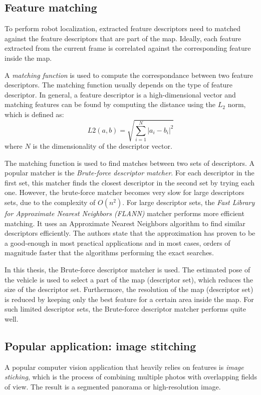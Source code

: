 \subsection{Feature matching}
\label{sec:theory_feature_matching}
To perform robot localization, extracted feature descriptors need to matched against the feature descriptors that are part of the map.
Ideally, each feature extracted from the current frame is correlated against the corresponding feature inside the map.

A \textit{matching function} is used to compute the correspondance between two feature descriptors.
The matching function usually depends on the type of feature descriptor.
In general, a feature descriptor is a high-dimensional vector and matching features can be found by computing the distance using the $L_2$ norm, which is defined as:
\begin{equation}
L2(a,b) =\sqrt { \sum_{i=1}^{N} \left| a_i - b_i \right| ^2 }
\end{equation}
where $N$ is the dimensionality of the descriptor vector.

The matching function is used to find matches between two sets of descriptors.
A popular matcher is the \textit{Brute-force descriptor matcher}. For each descriptor in the first set, this matcher finds the closest descriptor in the second set by trying each one.
However, the brute-force matcher becomes very slow for large descriptors sets, due to the complexity of $O(n^2)$.
For large descriptor sets, the \textit{Fast Library for Approximate Nearest Neighbors (FLANN)} \cite{muja2009flann} matcher performs more efficient matching.
It uses an Approximate Nearest Neighbors algorithm to find similar descriptors efficiently.
The authors state that the approximation has proven to be a good-enough in most practical applications and in most cases, orders of magnitude faster that the algorithms performing the exact searches.

In this thesis, the Brute-force descriptor matcher is used.
The estimated pose of the vehicle is used to select a part of the map (descriptor set), which reduces the size of the descriptor set.
Furthermore, the resolution of the map (descriptor set) is reduced by keeping only the best feature for a certain area inside the map.
For such limited descriptor sets, the Brute-force descriptor matcher performs quite well.


\subsection{Popular application: image stitching}
A popular computer vision application that heavily relies on features is \textit{image stiching}, which is the process of combining multiple photos with overlapping fields of view.
The result is a segmented panorama or high-resolution image. 


